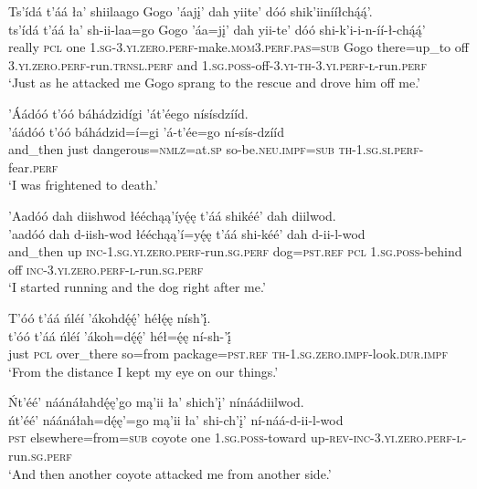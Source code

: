 \ea\label{ex:text6-15-7}
Ts’ídá t’áá ła’ shiilaago Gogo ’áajį’ dah yiite’ dóó shik’iinííłchą́ą́’.\\
\gll ts’ídá	t’áá	ła’	sh-ii-laa=go	Gogo	’áa=jį’	dah	yii-te’	dóó	shi-k’i-i-n-íí-ł-chą́ą́’\\
     really	\textsc{pcl}	one	1.\textsc{sg}-3.\textsc{yi}.\textsc{zero}.\textsc{perf}-make.\textsc{mom}3.\textsc{perf}.\textsc{pas}=\textsc{sub}	Gogo	there=up\_to	off	3.\textsc{yi}.\textsc{zero}.\textsc{perf}-run.\textsc{trnsl}.\textsc{perf}	and	1.\textsc{sg}.\textsc{poss}-off-3.\textsc{yi}-\textsc{th}-3.\textsc{yi}.\textsc{perf}-\textsc{ł}-run.\textsc{perf}\\
\glt `Just as he attacked me Gogo sprang to the rescue and drove him off me.'
\z

\ea\label{ex:text6-15-8}
’Áádóó t’óó báhádzidígi ’át’éego nísísdzííd.\\
\gll ’áádóó	t’óó	báhádzid=í=gi	’á-t’ée=go	ní-sís-dzííd\\
     and\_then	just	dangerous=\textsc{nmlz}=at.\textsc{sp}	so-be.\textsc{neu}.\textsc{impf}=\textsc{sub}	\textsc{th}-1.\textsc{sg}.\textsc{si}.\textsc{perf}-fear.\textsc{perf}\\
\glt `I was frightened to death.'
\z

\ea\label{ex:text6-15-9}
’Aadóó dah diishwod łééchąą’íyę́ę t’áá shikéé’ dah diilwod.\\
\gll ’aadóó	dah	d-iish-wod	łééchąą’í=yę́ę	t’áá	shi-kéé’	dah	d-ii-l-wod\\
     and\_then	up	\textsc{inc}-1.\textsc{sg}.\textsc{yi}.\textsc{zero}.\textsc{perf}-run.\textsc{sg}.\textsc{perf}	dog=\textsc{pst}.\textsc{ref}	\textsc{pcl}	1.\textsc{sg}.\textsc{poss}-behind	off	\textsc{inc}-3.\textsc{yi}.\textsc{zero}.\textsc{perf}-\textsc{l}-run.\textsc{sg}.\textsc{perf}\\
\glt `I started running and the dog right after me.'
\z

\ea\label{ex:text6-15-10}
T’óó t’áá ńléí ’ákohdę́ę́’ héłę́ę nísh’į́.\\
\gll t’óó	t’áá	ńléí	’ákoh=dę́ę́’	héł=ę́ę	ní-sh-’į́\\
     just	\textsc{pcl}	over\_there	so=from	package=\textsc{pst}.\textsc{ref}	\textsc{th}-1.\textsc{sg}.\textsc{zero}.\textsc{impf}-look.\textsc{dur}.\textsc{impf}\\
\glt `From the distance I kept my eye on our things.'
\z

\ea\label{ex:text6-15-11}
Ńt’éé’ náánáłahdę́ę’go mą’ii ła’ shich’į’ nínáádiilwod.\\
\gll ńt’éé’	náánáłah=dę́ę’=go	mą’ii	ła’	shi-ch’į’	ní-náá-d-ii-l-wod\\
     \textsc{pst}	elsewhere=from=\textsc{sub}	coyote	one	1.\textsc{sg}.\textsc{poss}-toward	up-\textsc{rev}-\textsc{inc}-3.\textsc{yi}.\textsc{zero}.\textsc{perf}-\textsc{l}-run.\textsc{sg}.\textsc{perf}\\
\glt `And then another coyote attacked me from another side.'
\z

